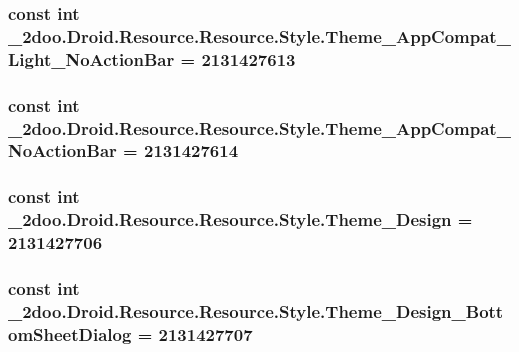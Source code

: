 \hypertarget{class__2doo_1_1_droid_1_1_resource_1_1_style_3e1366fe3080381361828dd7a320cda8}{
\subsubsection[{Theme\_\-AppCompat\_\-Light\_\-NoActionBar}]{\setlength{\rightskip}{0pt plus 5cm}const int \_\-2doo.Droid.Resource.Resource.Style.Theme\_\-AppCompat\_\-Light\_\-NoActionBar = 2131427613}}
\label{class__2doo_1_1_droid_1_1_resource_1_1_style_3e1366fe3080381361828dd7a320cda8}


\hypertarget{class__2doo_1_1_droid_1_1_resource_1_1_style_74b80308893ae2bea46696569ba0cacf}{
\subsubsection[{Theme\_\-AppCompat\_\-NoActionBar}]{\setlength{\rightskip}{0pt plus 5cm}const int \_\-2doo.Droid.Resource.Resource.Style.Theme\_\-AppCompat\_\-NoActionBar = 2131427614}}
\label{class__2doo_1_1_droid_1_1_resource_1_1_style_74b80308893ae2bea46696569ba0cacf}


\hypertarget{class__2doo_1_1_droid_1_1_resource_1_1_style_0c3d3f264c0ec4345e6bfabc4f331462}{
\subsubsection[{Theme\_\-Design}]{\setlength{\rightskip}{0pt plus 5cm}const int \_\-2doo.Droid.Resource.Resource.Style.Theme\_\-Design = 2131427706}}
\label{class__2doo_1_1_droid_1_1_resource_1_1_style_0c3d3f264c0ec4345e6bfabc4f331462}


\hypertarget{class__2doo_1_1_droid_1_1_resource_1_1_style_7f79cbee5345007eeba66b709c4f6577}{
\subsubsection[{Theme\_\-Design\_\-BottomSheetDialog}]{\setlength{\rightskip}{0pt plus 5cm}const int \_\-2doo.Droid.Resource.Resource.Style.Theme\_\-Design\_\-BottomSheetDialog = 2131427707}}
\label{class__2doo_1_1_droid_1_1_resource_1_1_style_7f79cbee5345007eeba66b709c4f6577}



